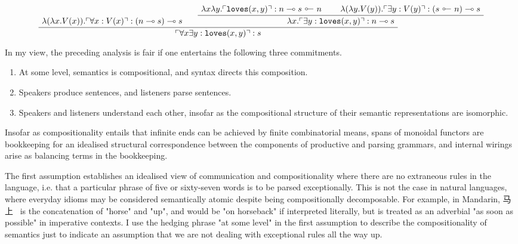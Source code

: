 \begin{example}
\[
\AxiomC{$\lambda (\lambda x . V(x)) . \ulcorner \forall x : V(x) \urcorner : (n \multimap s) \multimap s$}
\AxiomC{$\lambda x \lambda y . \ulcorner \texttt{loves}(x,y) \urcorner : n \multimap s \ \rotatebox[origin=c]{180}{$\multimap$} \ n$}
\AxiomC{$\lambda (\lambda y . V(y)) . \ulcorner \exists y : V(y) \urcorner : (s \ \rotatebox[origin=c]{180}{$\multimap$} \ n) \multimap s$}
\BinaryInfC{$\lambda x . \ulcorner \exists y : \texttt{loves}(x,y) \urcorner : n \multimap s$}
\BinaryInfC{$ \ulcorner \forall x \exists y : \texttt{loves}(x,y) \urcorner : s$}
\DisplayProof
\]
\end{example}

 In my view, the preceding analysis is fair if one entertains the following three commitments.

\begin{enumerate}
\item{At some level, semantics is compositional, and syntax directs this composition.}
\item{Speakers produce sentences, and listeners parse sentences.}
\item{Speakers and listeners understand each other, insofar as the compositional structure of their semantic representations are isomorphic.}
\end{enumerate}

Insofar as compositionality entails that infinite ends can be achieved by finite combinatorial means, spans of monoidal functors are bookkeeping for an idealised structural correspondence between the components of productive and parsing grammars, and internal wirings arise as balancing terms in the bookkeeping.\\


\begin{CJK*}{UTF8}{gbsn}
The first assumption establishes an idealised view of communication and compositionality where there are no extraneous rules in the language, i.e. that a particular phrase of five or sixty-seven words is to be parsed exceptionally. This is not the case in natural languages, where everyday idioms may be considered semantically atomic despite being compositionally decomposable. For example, in Mandarin, 马上 \ is the concatenation of "horse" and "up", and would be "on horseback" if interpreted literally, but is treated as an adverbial "as soon as possible" in imperative contexts. I use the hedging phrase "at some level" in the first assumption to describe the compositionality of semantics just to indicate an assumption that we are not dealing with exceptional rules all the way up.\\
\end{CJK*}

